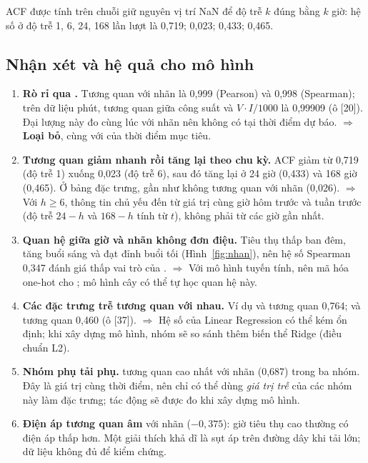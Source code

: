 \documentclass[../main.tex]{subfiles}
\begin{document}
ACF được tính trên chuỗi giữ nguyên vị trí NaN để độ trễ $k$ đúng bằng $k$ giờ: hệ số ở độ trễ 1, 6, 24, 168 lần lượt là 0,719; 0,023; 0,433; 0,465.

\subsection{Nhận xét và hệ quả cho mô hình}
\begin{enumerate}[1.]
    \item \textbf{Rò rỉ qua .} Tương quan với nhãn là 0,999 (Pearson) và 0,998 (Spearman); trên dữ liệu phút, tương quan giữa công suất và $V \cdot I / 1000$ là 0,99909 (ô [20]). Đại lượng này đo cùng lúc với nhãn nên không có tại thời điểm dự báo. $\Rightarrow$ \textbf{Loại bỏ}, cùng với  của thời điểm mục tiêu.
    \item \textbf{Tương quan giảm nhanh rồi tăng lại theo chu kỳ.} ACF giảm từ 0,719 (độ trễ 1) xuống 0,023 (độ trễ 6), sau đó tăng lại ở 24 giờ (0,433) và 168 giờ (0,465). Ở bảng đặc trưng,  gần như không tương quan với nhãn (0,026). $\Rightarrow$ Với $h \ge 6$, thông tin chủ yếu đến từ giá trị cùng giờ hôm trước và tuần trước (độ trễ $24 - h$ và $168 - h$ tính từ $t$), không phải từ các giờ gần nhất.
    \item \textbf{Quan hệ giữa giờ và nhãn không đơn điệu.} Tiêu thụ thấp ban đêm, tăng buổi sáng và đạt đỉnh buổi tối (Hình~\ref{fig:nhan}), nên hệ số Spearman 0,347 đánh giá thấp vai trò của . $\Rightarrow$ Với mô hình tuyến tính, nên mã hóa one-hot cho ; mô hình cây có thể tự học quan hệ này.
    \item \textbf{Các đặc trưng trễ tương quan với nhau.} Ví dụ  và  tương quan 0,764;  và  tương quan 0,460 (ô [37]). $\Rightarrow$ Hệ số của Linear Regression có thể kém ổn định; khi xây dựng mô hình, nhóm sẽ so sánh thêm biến thể Ridge (điều chuẩn L2).
    \item \textbf{Nhóm phụ tải phụ.}  tương quan cao nhất với nhãn (0,687) trong ba nhóm. Đây là giá trị cùng thời điểm, nên chỉ có thể dùng \textit{giá trị trễ} của các nhóm này làm đặc trưng; tác động sẽ được đo khi xây dựng mô hình.
    \item \textbf{Điện áp tương quan âm} với nhãn ($-0{,}375$): giờ tiêu thụ cao thường có điện áp thấp hơn. Một giải thích khả dĩ là sụt áp trên đường dây khi tải lớn; dữ liệu không đủ để kiểm chứng.
\end{enumerate}
\end{document}
